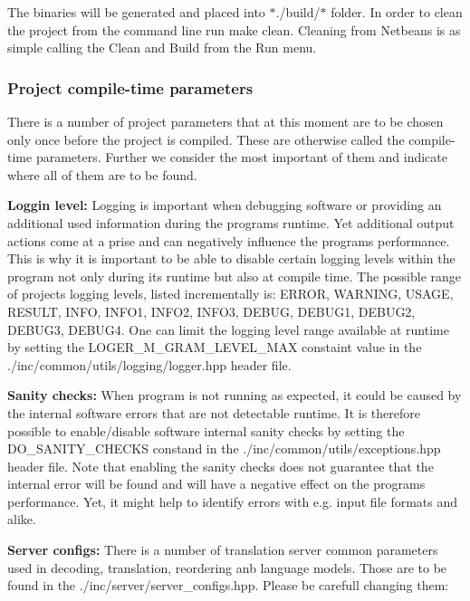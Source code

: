 The binaries will be generated and placed into $\ast$./build/$\ast$ folder. In order to clean the project from the command line run {\ttfamily make clean}. Cleaning from Netbeans is as simple calling the {\ttfamily Clean and Build} from the {\ttfamily Run} menu.

\subsubsection*{Project compile-\/time parameters}

There is a number of project parameters that at this moment are to be chosen only once before the project is compiled. These are otherwise called the compile-\/time parameters. Further we consider the most important of them and indicate where all of them are to be found.

{\bfseries Loggin level\+:} Logging is important when debugging software or providing an additional used information during the program\textquotesingle{}s runtime. Yet additional output actions come at a prise and can negatively influence the program\textquotesingle{}s performance. This is why it is important to be able to disable certain logging levels within the program not only during its runtime but also at compile time. The possible range of project\textquotesingle{}s logging levels, listed incrementally is\+: E\+R\+R\+O\+R, W\+A\+R\+N\+I\+N\+G, U\+S\+A\+G\+E, R\+E\+S\+U\+L\+T, I\+N\+F\+O, I\+N\+F\+O1, I\+N\+F\+O2, I\+N\+F\+O3, D\+E\+B\+U\+G, D\+E\+B\+U\+G1, D\+E\+B\+U\+G2, D\+E\+B\+U\+G3, D\+E\+B\+U\+G4. One can limit the logging level range available at runtime by setting the {\ttfamily L\+O\+G\+E\+R\+\_\+\+M\+\_\+\+G\+R\+A\+M\+\_\+\+L\+E\+V\+E\+L\+\_\+\+M\+A\+X} constaint value in the {\ttfamily ./inc/common/utils/logging/logger.hpp} header file.

{\bfseries Sanity checks\+:} When program is not running as expected, it could be caused by the internal software errors that are not detectable runtime. It is therefore possible to enable/disable software internal sanity checks by setting the {\ttfamily D\+O\+\_\+\+S\+A\+N\+I\+T\+Y\+\_\+\+C\+H\+E\+C\+K\+S} constand in the {\ttfamily ./inc/common/utils/exceptions.hpp} header file. Note that enabling the sanity checks does not guarantee that the internal error will be found and will have a negative effect on the program\textquotesingle{}s performance. Yet, it might help to identify errors with e.\+g. input file formats and alike.

{\bfseries Server configs\+:} There is a number of translation server common parameters used in decoding, translation, reordering anb language models. Those are to be found in the {\ttfamily ./inc/server/server\+\_\+configs.hpp}. Please be carefull changing them\+:


